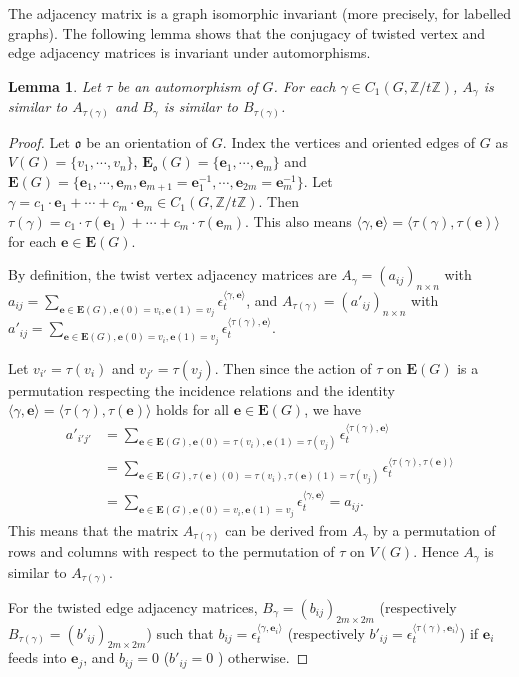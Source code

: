 \documentclass[11pt]{amsart}
\theoremstyle{plain}
\newtheorem{lemma}[theorem]{Lemma}
\theoremstyle{definition}
\newcommand{\mbbZ}{{\mathbb Z}}
\newcommand{\mfrako}{{\mathfrak o}}
\newcommand{\ve}{{\mathbf e}}
\newcommand{\vE}{{\mathbf E}}
\numberwithin{equation}{section}
\begin{document}
The adjacency matrix is a graph isomorphic invariant (more precisely, for labelled graphs). The following lemma shows that the conjugacy of twisted vertex and edge adjacency matrices is invariant under automorphisms. 
\begin{lemma} \label{L:auto}
Let $\tau$ be an automorphism of $G$. For each $\gamma\in C_1(G,\mbbZ/t\mbbZ)$, $A_\gamma$ is similar to $A_{\tau(\gamma)}$ and $B_\gamma$ is similar to $B_{\tau(\gamma)}$.
\end{lemma}

\begin{proof}
Let $\mfrako$ be an orientation of $G$. 
Index the vertices and oriented edges of $G$ as $V(G)=\{v_1,\cdots,v_n\}$, $\vE_\mfrako(G)=\{\ve_1,\cdots,\ve_m\}$ and $\vE(G)=\{\ve_1,\cdots,\ve_m,\ve_{m+1}=\ve_1^{-1},\cdots,\ve_{2m}=\ve_m^{-1}\}$.  Let $\gamma=c_1\cdot \ve_1+\cdots+c_m\cdot \ve_m\in C_1(G,\mbbZ/t\mbbZ)$. Then $\tau(\gamma)=c_1\cdot \tau(\ve_1)+\cdots+c_m\cdot \tau(\ve_m)$. This also means $\langle \gamma,\ve\rangle = \langle \tau(\gamma),\tau(\ve)\rangle$ for each $\ve\in \vE(G)$. 

By definition, the twist vertex adjacency matrices are $A_\gamma=(a_{ij})_{n\times n}$ with $a_{ij}=\sum_{\ve\in \vE(G),\ve(0)=v_i,\ve(1)=v_j} \epsilon_t^{\langle\gamma,\ve\rangle}$, and $A_{\tau(\gamma)}=(a'_{ij})_{n\times n}$ with $a'_{ij}=\sum_{\ve\in \vE(G),\ve(0)=v_i,\ve(1)=v_j} \epsilon_t^{\langle\tau(\gamma),\ve\rangle}$. 

Let $v_{i'}=\tau(v_i)$ and $v_{j'}=\tau(v_j)$. Then since the action of $\tau$  on $\vE(G)$ is a permutation respecting the incidence relations and the identity $\langle \gamma,\ve\rangle = \langle \tau(\gamma),\tau(\ve)\rangle$ holds for all $\ve\in \vE(G)$, we have
\begin{align*}
a'_{i'j'}&=\sum_{\ve\in \vE(G),\ve(0)=\tau(v_i),\ve(1)=\tau(v_j)} \epsilon_t^{\langle\tau(\gamma),\ve\rangle} \\
&=\sum_{\ve\in \vE(G),\tau(\ve)(0)=\tau(v_i),\tau(\ve)(1)=\tau(v_j)} \epsilon_t^{\langle\tau(\gamma),\tau(\ve)\rangle} \\
&=\sum_{\ve\in \vE(G),\ve(0)=v_i,\ve(1)=v_j} \epsilon_t^{\langle\gamma,\ve\rangle} = a_{ij}. 
\end{align*}
This means that the matrix $A_{\tau(\gamma)}$ can be derived from $A_\gamma$ by a permutation of rows and columns with respect to the permutation of $\tau$ on $V(G)$. Hence $A_\gamma$ is similar to $A_{\tau(\gamma)}$. 

For the twisted edge adjacency matrices, $B_\gamma=(b_{ij})_{2m\times 2m}$ (respectively $B_{\tau(\gamma)}=(b'_{ij})_{2m\times 2m}$) such that $b_{ij} =\epsilon_t^{\langle\gamma,\ve_i\rangle}$ (respectively $b'_{ij} =\epsilon_t^{\langle\tau(\gamma),\ve_i\rangle}$) if $\ve_i$ feeds into $\ve_j$, and $b_{ij}=0$ ($b'_{ij}=0$ ) otherwise.


\end{proof}
\end{document}
